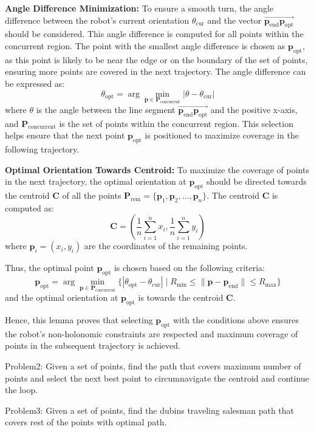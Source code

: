 \vspace*{6mm}  


\textbf{Angle Difference Minimization:}
To ensure a smooth turn, the angle difference between the robot's current orientation $\theta_{\text{cur}}$ and the vector $\overrightarrow{\mathbf{p}_{\text{end}}\mathbf{p}_{\text{opt}}}$ should be considered. This angle difference is computed for all points within the concurrent region. The point with the smallest angle difference is chosen as $\mathbf{p}_{\text{opt}}$, as this point is likely to be near the edge or on the boundary of the set of points, ensuring more points are covered in the next trajectory. The angle difference can be expressed as:
\[
\theta_{\text{opt}} = \arg\min_{\mathbf{p} \in \mathbf{P}_{\text{concurrent}}} |\theta - \theta_{\text{cur}}|
\]
where $\theta$ is the angle between the line segment $\overrightarrow{\mathbf{p}_{\text{end}}\mathbf{p}_{\text{opt}}}$ and the positive x-axis, and $\mathbf{P}_{\text{concurrent}}$ is the set of points within the concurrent region. This selection helps ensure that the next point $\mathbf{p}_{\text{opt}}$ is positioned to maximize coverage in the following trajectory.


\vspace*{6mm}  


\textbf{Optimal Orientation Towards Centroid:}
To maximize the coverage of points in the next trajectory, the optimal orientation at $\mathbf{p}_{\text{opt}}$ should be directed towards the centroid $\mathbf{C}$ of all the points $\mathbf{P}_{\text{rem}} = \{ \mathbf{p}_1, \mathbf{p}_2, \ldots, \mathbf{p}_n \}$. The centroid $\mathbf{C}$ is computed as:
\[
\mathbf{C} = \left( \frac{1}{n} \sum_{i=1}^{n} x_i, \frac{1}{n} \sum_{i=1}^{n} y_i \right)
\]
where $\mathbf{p}_i = (x_i, y_i)$ are the coordinates of the remaining points.

Thus, the optimal point $\mathbf{p}_{\text{opt}}$ is chosen based on the following criteria:
\[
\mathbf{p}_{\text{opt}} = \arg\min_{\mathbf{p} \in \mathbf{P}_{\text{concurrent}}} \{ |\theta_{\text{opt}} - \theta_{\text{cur}}| \mid R_{\min} \leq \|\mathbf{p} - \mathbf{p}_{\text{end}}\| \leq R_{\max} \}
\]
and the optimal orientation at $\mathbf{p}_{\text{opt}}$ is towards the centroid $\mathbf{C}$.



\vspace*{6mm}  


Hence, this lemma proves that selecting $\mathbf{p}_{\text{opt}}$ with the conditions above ensures the robot's non-holonomic constraints are respected and maximum coverage of points in the subsequent trajectory is achieved.



\vspace*{6mm}  


Problem2: Given a set of points, find the path that covers maximum number of points and select the next best point to circumnavigate the centroid and continue the loop.



Problem3: Given a set of points, find the dubins traveling salesman path that covers rest of the points with optimal path.


